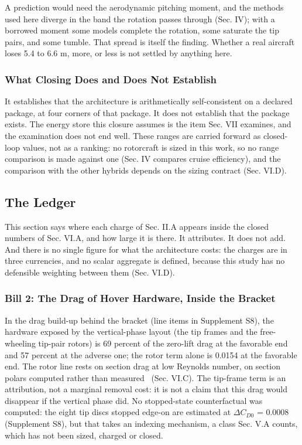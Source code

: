 \documentclass[journal]{new-aiaa}
\begin{document}
A prediction would need the aerodynamic pitching moment, and the methods used here diverge in the band the rotation passes through (Sec. IV); with a borrowed moment some models complete the rotation, some saturate the tip pairs, and some tumble. That spread is itself the finding. Whether a real aircraft loses 5.4 to 6.6 m, more, or less is not settled by anything here.

\subsubsection{What Closing Does and Does Not Establish}

It establishes that the architecture is arithmetically self-consistent on a declared package, at four corners of that package. It does not establish that the package exists. The energy store this closure assumes is the item Sec. VII examines, and the examination does not end well. These ranges are carried forward as closed-loop values, not as a ranking: no rotorcraft is sized in this work, so no range comparison is made against one (Sec. IV compares cruise efficiency), and the comparison with the other hybrids depends on the sizing contract (Sec. VI.D).

\subsection{The Ledger}

This section says where each charge of Sec. II.A appears inside the closed numbers of Sec. VI.A, and how large it is there. It attributes. It does not add. And there is no single figure for what the architecture costs: the charges are in three currencies, and no scalar aggregate is defined, because this study has no defensible weighting between them (Sec. VI.D).

\subsubsection{Bill 2: The Drag of Hover Hardware, Inside the Bracket}

In the drag build-up behind the bracket (line items in Supplement S8), the hardware exposed by the vertical-phase layout (the tip frames and the free-wheeling tip-pair rotors) is 69 percent of the zero-lift drag at the favorable end and 57 percent at the adverse one; the rotor term alone is 0.0154 at the favorable end. The rotor line rests on section drag at low Reynolds number, on section polars computed rather than measured~\cite{r19} (Sec. VI.C). The tip-frame term is an attribution, not a marginal removal cost: it is not a claim that this drag would disappear if the vertical phase did. No stopped-state counterfactual was computed: the eight tip discs stopped edge-on are estimated at $\Delta C_{D0}$ = 0.0008 (Supplement S8), but that takes an indexing mechanism, a class Sec. V.A counts, which has not been sized, charged or closed.
\end{document}
